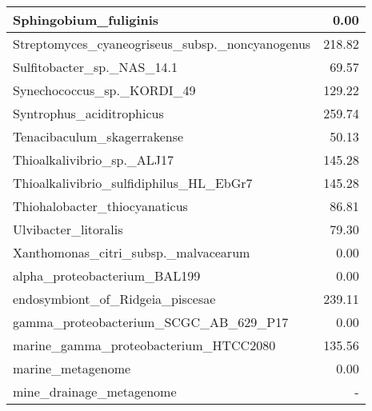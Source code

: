 \documentclass[12pt,a4paper]{article}
\begin{document}
\begin{table}[ht]
\begin{center}
\begin{tabular}{|l*{1}{|r}|}
Sphingobium\_fuliginis & 0.00 \\ \hline
Streptomyces\_cyaneogriseus\_subsp.\_noncyanogenus & 218.82 \\ \hline
Sulfitobacter\_sp.\_NAS\_14.1 & 69.57 \\ \hline
Synechococcus\_sp.\_KORDI\_49 & 129.22 \\ \hline
Syntrophus\_aciditrophicus & 259.74 \\ \hline
Tenacibaculum\_skagerrakense & 50.13 \\ \hline
Thioalkalivibrio\_sp.\_ALJ17 & 145.28 \\ \hline
Thioalkalivibrio\_sulfidiphilus\_HL\_EbGr7 & 145.28 \\ \hline
Thiohalobacter\_thiocyanaticus & 86.81 \\ \hline
Ulvibacter\_litoralis & 79.30 \\ \hline
Xanthomonas\_citri\_subsp.\_malvacearum & 0.00 \\ \hline
alpha\_proteobacterium\_BAL199 & 0.00 \\ \hline
endosymbiont\_of\_Ridgeia\_piscesae & 239.11 \\ \hline
gamma\_proteobacterium\_SCGC\_AB\_629\_P17 & 0.00 \\ \hline
marine\_gamma\_proteobacterium\_HTCC2080 & 135.56 \\ \hline
marine\_metagenome & 0.00 \\ \hline
mine\_drainage\_metagenome & - \\ \hline
\end{tabular}
\end{center}
\end{table}
\end{document}
